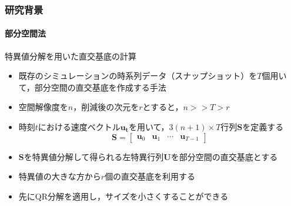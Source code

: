 \documentclass[aspectratio=169,dvipdfmx,hyperref={bookmarks=true}]{beamer}
\begin{document}
   \begin{frame}
  \frametitle{研究背景}
    \framesubtitle{部分空間法}
   \begin{block}{特異値分解を用いた直交基底の計算}
   \begin{itemize}
   \item 既存のシミュレーションの時系列データ（スナップショット）を$T$個用いて，部分空間の直交基底を作成する手法
\item 空間解像度を$n$，削減後の次元を$r$とすると，$n >\!> T > r$ 
\item 時刻$t$における速度ベクトル$\bm{u_t}$を用いて，$3(n+1)\times T$行列$\bm{S}$を定義する
	 \[ \bm{S} = 
        		\begin{bmatrix}
   \bm{u}_0 & \bm{u}_1 &\cdots  & \bm{u}_{T-1}
\end{bmatrix}
\]
\item $\bm{S}$を特異値分解して得られる左特異行列$\bm{U}$を部分空間の直交基底とする
\item 特異値の大きな方から$r$個の直交基底を利用する
\item 先にQR分解を適用し，サイズを小さくすることができる
\end{itemize}
\end{block}

 \end{frame}
 
\end{document}

